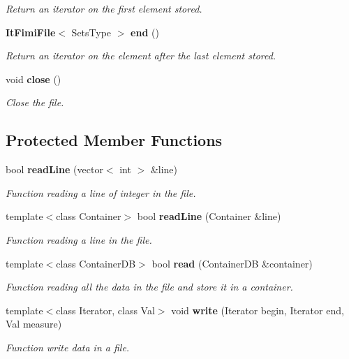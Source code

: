 \begin{CompactItemize}
\begin{CompactList}\small\item\em Return an iterator on the first element stored. \item\end{CompactList}\item 
{\bf It\-Fimi\-File}$<$ Sets\-Type $>$ {\bf end} ()\label{class_fimi_file_40d4c8c8d693bdb4b93ba601928e15d7}

\begin{CompactList}\small\item\em Return an iterator on the element after the last element stored. \item\end{CompactList}\item 
void {\bf close} ()\label{class_fimi_file_d4bb3dfd03745838c7a232e001a1eb7a}

\begin{CompactList}\small\item\em Close the file. \item\end{CompactList}\end{CompactItemize}
\subsection*{Protected Member Functions}
\begin{CompactItemize}
\item 
bool {\bf read\-Line} (vector$<$ int $>$ \&line)
\begin{CompactList}\small\item\em Function reading a line of integer in the file. \item\end{CompactList}\item 
template$<$class Container$>$ bool {\bf read\-Line} (Container \&line)
\begin{CompactList}\small\item\em Function reading a line in the file. \item\end{CompactList}\item 
template$<$class Container\-DB$>$ bool {\bf read} (Container\-DB \&container)
\begin{CompactList}\small\item\em Function reading all the data in the file and store it in a container. \item\end{CompactList}\item 
template$<$class Iterator, class Val$>$ void {\bf write} (Iterator begin, Iterator end, Val measure)
\begin{CompactList}\small\item\em Function write data in a file. \item\end{CompactList}\end{CompactItemize}
